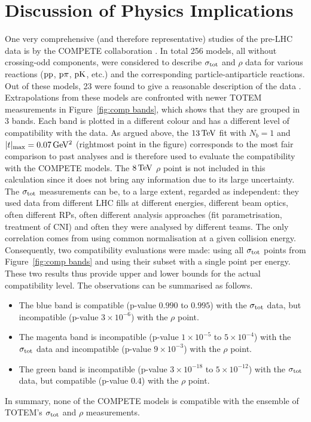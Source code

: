 \section{Discussion of Physics Implications}
\label{sec:discussion}

One very comprehensive (and therefore representative) studies of the pre-LHC data is by the COMPETE collaboration \cite{compete}. In total 256 models, all without crossing-odd components, were considered to describe $\sigma_{\rm tot}$ and $\rho$ data for various reactions ($\rm pp$, $\rm p\pi$, $\rm pK$, etc.) and the corresponding particle-antiparticle reactions. Out of these models, 23 were found to give a reasonable description of the data \cite{compete-details}. Extrapolations from these models are confronted with newer TOTEM measurements in Figure~\ref{fig:comp bands}, which shows that they are grouped in 3 bands. Each band is plotted in a different colour and has a different level of compatibility with the data. As argued above, the $13\,{\rm TeV}$ fit with $N_b=1$ and $|t|_{\rm max} = 0.07\,{\rm GeV^2}$ (rightmost point in the figure) corresponds to the most fair comparison to past analyses and is therefore used to evaluate the compatibility with the COMPETE models. The $8\,{\rm TeV}$ $\rho$ point is not included in this calculation since it does not bring any information due to its large uncertainty. The $\sigma_{\rm tot}$ measurements can be, to a large extent, regarded as independent: they used data from different LHC fills at different energies, different beam optics, often different RPs, often different analysis approaches (fit parametrisation, treatment of CNI) and often they were analysed by different teams. The only correlation comes from using common normalisation at a given collision energy. Consequently, two compatibility evaluations were made: using all $\sigma_{\rm tot}$ points from Figure~\ref{fig:comp bands} and using their subset with a single point per energy. These two results thus provide upper and lower bounds for the actual compatibility level. The observations can be summarised as follows.
\begin{itemize}[noitemsep,topsep=0pt]
\item The blue band is compatible (p-value $0.990$ to $0.995$) with the $\sigma_{\rm tot}$ data, but incompatible (p-value $3\times10^{-6}$) with the $\rho$ point.
\item The magenta band is incompatible (p-value $1\times10^{-5}$ to $5\times10^{-4}$) with the $\sigma_{\rm tot}$ data and incompatible (p-value $9\times10^{-3}$) with the $\rho$ point.
\item The green band is incompatible (p-value $3\times10^{-18}$ to $5\times10^{-12}$) with the $\sigma_{\rm tot}$ data, but compatible (p-value $0.4$) with the $\rho$ point.
\end{itemize}
In summary, none of the COMPETE models is compatible with the ensemble of TOTEM's $\sigma_{\rm tot}$ and $\rho$ measurements.

